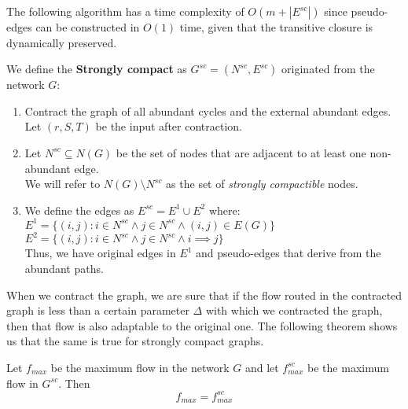     The following algorithm has a time complexity of \(O(m + |E^{sc}|)\) since pseudo-edges can be constructed in \(O(1)\) time, given that the transitive closure is dynamically preserved.

    \begin{definition}

        We define the \textbf{Strongly compact} as \(G^{sc} =(N^{sc}, E^{sc})\) originated from the network \(G\):
        \begin{enumerate}
            \item Contract the graph of all abundant cycles and the external abundant edges.\\
            Let \((r,S,T)\) be the input after contraction.
            \item Let \(N^{sc}\subseteq N(G)\) be the set of nodes that are adjacent to at least one non-abundant edge.\\
            We will refer to \(N(G)\setminus N^{sc}\) as the set of \textit{strongly compactible} nodes.
            \item We define the edges as \(E^{sc} = E^1 \cup E^2\) where:\\
            \(E^1 = \{(i,j): i\in N^{sc}\land j\in N^{sc}\land (i,j)\in E(G)\}\)\\
            \(E^2 = \{(i,j): i\in N^{sc}\land j\in N^{sc}\land i\implies j\}\)\\
            Thus, we have original edges in \(E^1\) and pseudo-edges that derive from the abundant paths.
        \end{enumerate}
    \end{definition}

    When we contract the graph, we are sure that if the flow routed in the contracted graph is less than a certain parameter \(\Delta\) with which we contracted the graph, then that flow is also adaptable to the original one. The following theorem shows us that the same is true for strongly compact graphs.
    \newpage

    \begin{theorem}[$f_{max} = f_{max}^{sc}$]

        \label{fmaxfsc}
        Let \(f_{max}\) be the maximum flow in the network \(G\) and let \(f_{max}^{sc}\) be the maximum flow in \(G^{sc}\). Then 
        \[f_{max} = f_{max}^{sc}\]
    \end{theorem}


